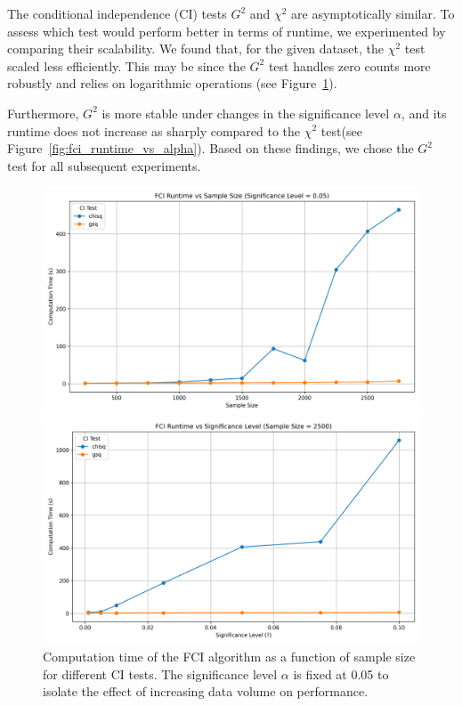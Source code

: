 \documentclass[main.tex]{subfiles}
\begin{document}
The conditional independence (CI) tests $G^2$ and $\chi^2$ are asymptotically similar. To assess which test would perform better in terms of runtime, we experimented by comparing their scalability. We found that, for the given dataset, the $\chi^2$ test scaled less efficiently. This may be since the $G^2$ test handles zero counts more robustly and relies on logarithmic operations (see Figure~\ref{fig:fci_runtime_vs_samplesize}).

Furthermore, $G^2$ is more stable under changes in the significance level $\alpha$, and its runtime does not increase as sharply compared to the $\chi^2$ test(see Figure~\ref{fig:fci_runtime_vs_alpha}). Based on these findings, we chose the $G^2$ test for all subsequent experiments.
\begin{figure}[h]
    \centering
    \begin{minipage}{0.48\textwidth}
        \centering
        \includegraphics[width = 1\linewidth]{Report/final_report/pictures/fci_runtime_vs_samplesize.png}
        \caption{Computation time of the FCI algorithm as a function of sample size for different CI tests. The significance level $\alpha$ is fixed at 0.05 to isolate the effect of increasing data volume on performance.}
        \label{fig:fci_runtime_vs_samplesize}
    \end{minipage}\hfill
    \begin{minipage}{0.48\textwidth}
        \centering
        \includegraphics[width = 1\linewidth]{Report/final_report/pictures/fci_runtime_vs_alpha.png}

\end{minipage}
\end{figure}
\end{document}
